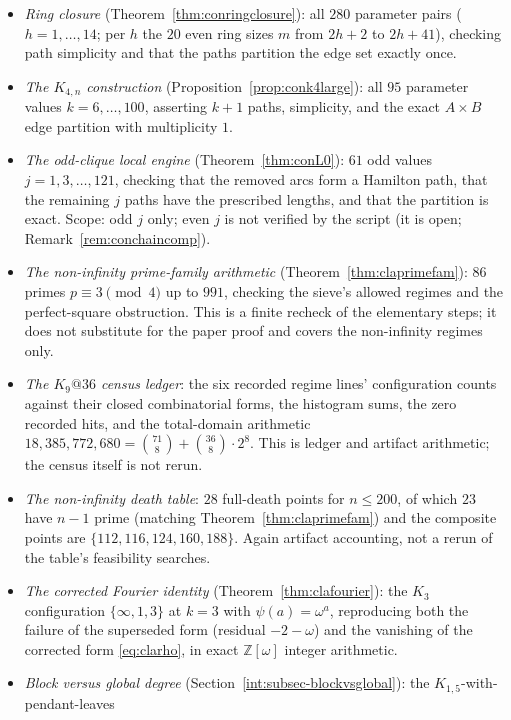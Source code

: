 \begin{itemize}[leftmargin=1.8em]
\item \emph{Ring closure} (Theorem~\ref{thm:conringclosure}): all $280$
parameter pairs ($h=1,\dots,14$; per $h$ the $20$ even ring sizes $m$ from
$2h+2$ to $2h+41$), checking path simplicity and that the paths partition
the edge set exactly once.
\item \emph{The $K_{4,n}$ construction} (Proposition~\ref{prop:conk4large}):
all $95$ parameter values $k=6,\dots,100$, asserting $k+1$ paths, simplicity,
and the exact $A\times B$ edge partition with multiplicity $1$.
\item \emph{The odd-clique local engine} (Theorem~\ref{thm:conL0}): $61$ odd
values $j=1,3,\dots,121$, checking that the removed arcs form a Hamilton
path, that the remaining $j$ paths have the prescribed lengths, and that the
partition is exact. Scope: odd $j$ only; even $j$ is not verified by the
script (it is open; Remark~\ref{rem:conchaincomp}).
\item \emph{The non-infinity prime-family arithmetic}
(Theorem~\ref{thm:claprimefam}): $86$ primes $p\equiv3\pmod4$ up to $991$,
checking the sieve's allowed regimes and the perfect-square obstruction. This
is a finite recheck of the elementary steps; it does not substitute for the
paper proof and covers the non-infinity regimes only.
\item \emph{The $K_9@36$ census ledger}: the six recorded regime lines'
configuration counts against their closed combinatorial forms, the histogram
sums, the zero recorded hits, and the total-domain arithmetic
$18{,}385{,}772{,}680=\binom{71}{8}+\binom{36}{8}\cdot2^8$. This is ledger
and artifact arithmetic; the census itself is not rerun.
\item \emph{The non-infinity death table}: $28$ full-death points for
$n\le200$, of which $23$ have $n-1$ prime (matching
Theorem~\ref{thm:claprimefam}) and the composite points are
$\{112,116,124,160,188\}$. Again artifact accounting, not a rerun of the
table's feasibility searches.
\item \emph{The corrected Fourier identity} (Theorem~\ref{thm:clafourier}):
the $K_3$ configuration $\{\infty,1,3\}$ at $k=3$ with $\psi(a)=\omega^a$,
reproducing both the failure of the superseded form (residual $-2-\omega$)
and the vanishing of the corrected form \eqref{eq:clarho}, in exact
$\mathbb{Z}[\omega]$ integer arithmetic.
\item \emph{Block versus global degree}
(Section~\ref{int:subsec-blockvsglobal}): the $K_{1,5}$-with-pendant-leaves

\end{itemize}
